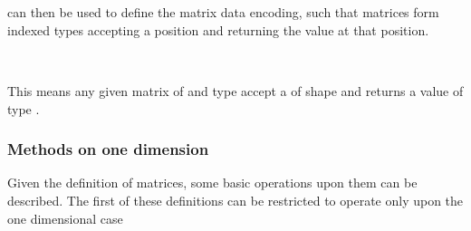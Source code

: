 \begin{AgdaAlign}
\begin{code}%
%
\>[2]\AgdaSpace{}%
\AgdaSpace{}%
\AgdaSymbol{:}\AgdaSpace{}%
\AgdaSpace{}%
\AgdaSpace{}%
\AgdaSpace{}%
\<%
\\
\>[2][@{}l@{\AgdaIndent{0}}]%
\>[4]%
\>[8]\AgdaSymbol{:}\AgdaSpace{}%
\AgdaSpace{}%
\AgdaSpace{}%
\AgdaSpace{}%
\AgdaSpace{}%
\AgdaSymbol{(}\AgdaSpace{}%
\AgdaSymbol{)}\<%
\\
%
\>[4]\AgdaSpace{}%
\AgdaSymbol{:}\AgdaSpace{}%
\AgdaSpace{}%
\AgdaSpace{}%
\AgdaSpace{}%
\AgdaSpace{}%
\AgdaSpace{}%
\AgdaSpace{}%
\AgdaSpace{}%
\AgdaSymbol{(}\AgdaSpace{}%
\AgdaSpace{}%
\AgdaSymbol{)}\<%
\end{code}

 can then be used to define the matrix data encoding, such that
matrices form indexed types 
accepting a position and returning the value at that position.

\begin{code}%
%
\>[2]\AgdaSpace{}%
\AgdaSymbol{:}\AgdaSpace{}%
\AgdaSpace{}%
\AgdaSpace{}%
\AgdaSpace{}%
\AgdaSpace{}%
\<%
\\
%
\>[2]\AgdaSpace{}%
\AgdaSpace{}%
\AgdaSpace{}%
\AgdaSymbol{=}\AgdaSpace{}%
\AgdaSpace{}%
\AgdaSpace{}%
\AgdaSpace{}%
\<%
\end{code}
This means any given matrix of   and type  accept a
 of shape  and returns a value of type .
\end{AgdaAlign}

\subsubsection{Methods on one dimension}
Given the definition of matrices, some basic operations upon them can be described.
The first of these definitions can be restricted to operate only upon the one
dimensional case

